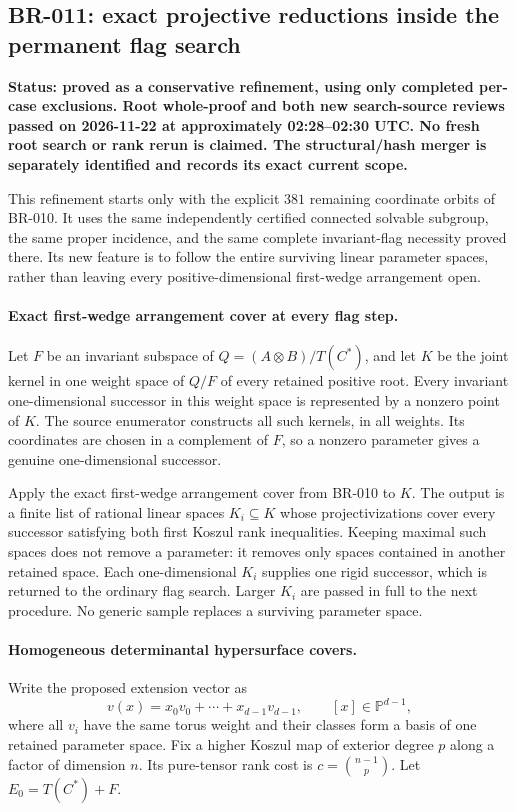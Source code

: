 \subsection*{BR-011: exact projective reductions inside the permanent flag search}
\textbf{Status: proved as a conservative refinement, using only completed
per-case exclusions.  Root whole-proof and both new search-source reviews
passed on 2026-11-22 at approximately 02:28--02:30 UTC.  No fresh root
search or rank rerun is claimed.  The structural/hash merger is separately
identified and records its exact current scope.}

This refinement starts only with the explicit $381$ remaining coordinate
orbits of BR-010.  It uses the same independently certified connected
solvable subgroup, the same proper incidence, and the same complete
invariant-flag necessity proved there.  Its new feature is to follow the
entire surviving linear parameter spaces, rather than leaving every
positive-dimensional first-wedge arrangement open.

\paragraph{Exact first-wedge arrangement cover at every flag step.}
Let $F$ be an invariant subspace of $Q=(A\otimes B)/T(C^*)$, and let
$K$ be the joint kernel in one weight space of $Q/F$ of every retained
positive root.  Every invariant one-dimensional successor in this
weight space is represented by a nonzero point of $K$.  The source
enumerator constructs all such kernels, in all weights.  Its coordinates
are chosen in a complement of $F$, so a nonzero parameter gives a genuine
one-dimensional successor.

Apply the exact first-wedge arrangement cover from BR-010 to $K$.
The output is a finite list of rational linear spaces $K_i\subseteq K$
whose projectivizations cover every successor satisfying both first
Koszul rank inequalities.  Keeping maximal such spaces does not remove
a parameter: it removes only spaces contained in another retained space.
Each one-dimensional $K_i$ supplies one rigid successor, which is returned
to the ordinary flag search.  Larger $K_i$ are passed in full to the next
procedure.  No generic sample replaces a surviving parameter space.

\paragraph{Homogeneous determinantal hypersurface covers.}
Write the proposed extension vector as
\[
 v(x)=x_0v_0+\cdots+x_{d-1}v_{d-1},\qquad [x]\in\mathbb P^{d-1},
\]
where all $v_i$ have the same torus weight and their classes form a basis
of one retained parameter space.  Fix a higher Koszul map of exterior
degree $p$ along a factor of dimension $n$.  Its pure-tensor rank cost is
$c=\binom{n-1}{p}$.  Let $E_0=T(C^*)+F$.

